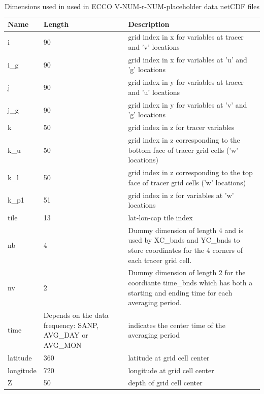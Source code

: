 \begin{longtable}{|p{}|p{}|m{}|}
\caption{Dimensions used in used in ECCO V-NUM-r-NUM-placeholder data netCDF files}
\label{tab:dimension-attributes} \\ 
\hline \endfirsthead
\endhead
\endfoot
\hline \endlastfoot
\rowcolor{blue!25} \textbf{Name} & \textbf{Length} & \textbf{Description} \\ \hline
\rowcolor{magenta!25}
i & 90 & grid index in x for variables at tracer and 'v' locations \\ \hline
\rowcolor{magenta!25}
i\_g & 90 & grid index in x for variables at 'u' and 'g' locations \\ \hline
\rowcolor{magenta!25}
j & 90 & grid index in y for variables at tracer and 'u' locations \\ \hline
\rowcolor{magenta!25}
j\_g & 90 & grid index in y for variables at 'v' and 'g' locations \\ \hline
\rowcolor{magenta!25}
k & 50 & grid index in z for tracer variables \\ \hline
\rowcolor{magenta!25}
k\_u & 50 & grid index in z corresponding to the bottom face of tracer grid cells ('w' locations) \\ \hline
\rowcolor{magenta!25}
k\_l & 50 & grid index in z corresponding to the top face of tracer grid cells ('w' locations) \\ \hline
\rowcolor{magenta!25}
k\_p1 & 51 & grid index in z for variables at 'w' locations \\ \hline
\rowcolor{magenta!25}
tile & 13 & lat-lon-cap tile index \\ \hline
\rowcolor{magenta!25}
nb & 4 & Dummy dimension of length 4 and is used by XC\_bnds and YC\_bnds to store coordinates for the 4 corners of each tracer grid cell. \\ \hline
\rowcolor{magenta!25}
nv & 2 & Dummy dimension of length 2 for the coordiante time\_bnds which has both a starting and ending time for each averaging period. \\ \hline
\rowcolor{magenta!25}
time & Depends on the data frequency: SANP, AVG\_DAY or AVG\_MON & indicates the center time of the averaging period \\ \hline
\rowcolor{magenta!25}
latitude & 360 & latitude at grid cell center \\ \hline
\rowcolor{magenta!25}
longitude & 720 & longitude at grid cell center \\ \hline
\rowcolor{magenta!25}
Z & 50 & depth of grid cell center \\ \hline
\end{longtable}
